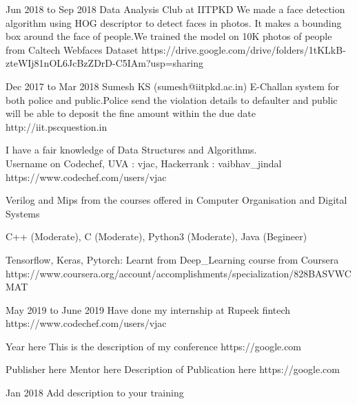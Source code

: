 {Jun 2018 to Sep 2018}
{Data Analysis Club at IITPKD}
{We made a face detection algorithm using HOG descriptor to detect faces in photos. It makes a bounding box around the face of people.We trained the model on 10K photos of people from Caltech Webfaces Dataset}
{https://drive.google.com/drive/folders/1tKLkB-zteWIj81nOL6JcBzZDrD-C5IAm?usp=sharing}

{Dec 2017 to Mar 2018}
{Sumesh KS (sumesh@iitpkd.ac.in)}
{E-Challan system for both police and public.Police send the violation details to defaulter and public will be able to deposit the fine amount within the due date}
{http://iit.pscquestion.in}


{I have a fair knowledge of Data Structures and Algorithms. \\Username on Codechef, UVA : vjac, Hackerrank : vaibhav\_jindal}
{https://www.codechef.com/users/vjac} 

{Verilog and Mips from the courses offered in Computer Organisation and Digital Systems}
{}                                                      %

{C++ (Moderate), C (Moderate), Python3 (Moderate), Java (Begineer)}
{}                                                      %

{Tensorflow, Keras, Pytorch: Learnt from Deep\_Learning course from Coursera}
{https://www.coursera.org/account/accomplishments/specialization/828BASVWCMAT}

{May 2019 to June 2019}
{Have done my internship at Rupeek fintech}
{https://www.codechef.com/users/vjac} 

{Year here}
{This is the description of my conference}
{https://google.com}

{Publisher here}
{Mentor here}
{Description of Publication here}
{https://google.com}

{Jan 2018}
{Add description to your training}


